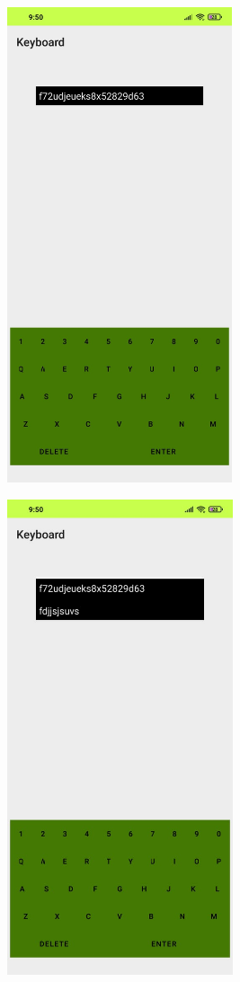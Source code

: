 \documentclass[12pt,letterpaper]{article}
\begin{document}
\begin{figure}
    \centering
    \includegraphics[height=14cm, keepaspectratio]{Keyboard/Outputs/OP1.png}
\end{figure}
\begin{figure}
    \centering
    \includegraphics[height=14cm, keepaspectratio]{Keyboard/Outputs/OP2.png}
\end{figure}
\end{document}
